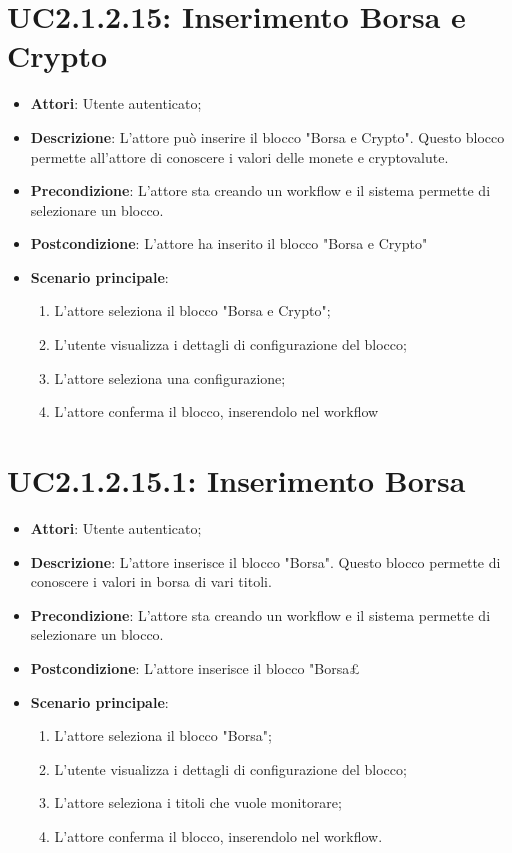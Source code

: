 \section{UC2.1.2.15: Inserimento Borsa e Crypto}
\label{UC2.1.2.15}
\begin{itemize}
	\item \textbf{Attori}: Utente autenticato;
	\item \textbf{Descrizione}: L'attore può inserire il blocco "Borsa e Crypto". Questo blocco permette all'attore di conoscere i valori delle monete e cryptovalute. 
	\item \textbf{Precondizione}: L'attore sta creando un workflow e il sistema permette di selezionare un blocco.
	\item \textbf{Postcondizione}: L'attore ha inserito il blocco "Borsa e Crypto"
	\item \textbf{Scenario principale}:
	\begin{enumerate} \item L'attore seleziona il blocco "Borsa e Crypto"; \item L'utente visualizza i dettagli di configurazione del blocco;  \item  L'attore seleziona una configurazione; \item L'attore conferma il blocco, inserendolo nel workflow \end{enumerate}
\end{itemize}

\section{UC2.1.2.15.1: Inserimento Borsa}
\label{UC2.1.2.15.1}
\begin{itemize}
	\item \textbf{Attori}: Utente autenticato;
	\item \textbf{Descrizione}: L'attore inserisce il blocco "Borsa". Questo blocco permette di conoscere i valori in borsa di vari titoli. 
	\item \textbf{Precondizione}: L'attore sta creando un workflow e il sistema permette di selezionare un blocco.
	\item \textbf{Postcondizione}: L'attore inserisce il blocco "Borsa£
	\item \textbf{Scenario principale}:
	\begin{enumerate} \item L'attore seleziona il blocco "Borsa"; \item L'utente visualizza i dettagli di configurazione del blocco;   \item  L'attore seleziona i titoli che vuole monitorare; \item L'attore conferma il blocco, inserendolo nel workflow. \end{enumerate}
\end{itemize}

